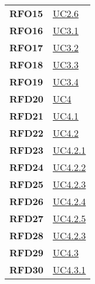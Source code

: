 \begin{longtable}[H]{>{\centering\bfseries}m{8cm} >{\centering\arraybackslash}m{8cm}}
    RFO15

    &   \hyperref[ssub:UC2.6]{UC2.6}\\

    RFO16
 
    &   \hyperref[ssub:uc3.1]{UC3.1} \\

    RFO17

    & \hyperref[sub:uc3.2]{UC3.2} \\

    RFO18

    &   \hyperref[sub:uc3.3]{UC3.3} \\

    RFO19
 
    &   \hyperref[ssub:uc3.4]{UC3.4} \\

    RFD20

    &  \hyperref[ssub:uc4]{UC4} \\

    RFD21

    &  \hyperref[ssub:uc4.1]{UC4.1} \\

    RFD22
   
    &  \hyperref[ssub:uc4.2]{UC4.2} \\

    RFD23
 
    &  \hyperref[ssub:uc4.2.1]{UC4.2.1} \\

    RFD24
 
    &  \hyperref[ssub:uc4.2.2]{UC4.2.2} \\

    RFD25
 
    &  \hyperref[ssub:uc4.2.3]{UC4.2.3} \\

    RFD26
    &  \hyperref[ssub:uc4.2.4]{UC4.2.4} \\

    RFD27
  
    &  \hyperref[ssub:uc4.2.5]{UC4.2.5} \\

    RFD28
  
    &  \hyperref[ssub:uc4.2.3]{UC4.2.3} \\

    RFD29
   
    &  \hyperref[ssub:uc4.3]{UC4.3} \\

    RFD30
    &  \hyperref[ssub:uc4.3.1]{UC4.3.1} \\


\end{longtable}
